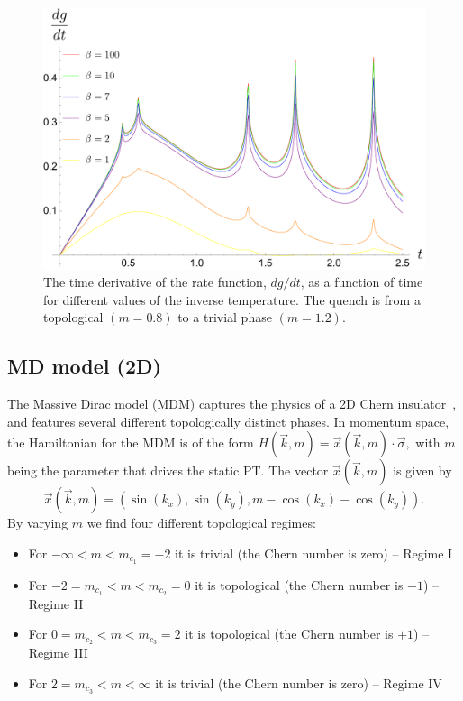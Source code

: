 \begin{figure}[h]
\begin{center}
\includegraphics[scale=0.3]{SSH_topological_to_trivial.pdf}
    \caption{The time derivative of the rate function, $dg/dt$, as a function of time for different values of the inverse temperature. The quench is from a topological $(m=0.8)$ to a trivial phase $  (m=1.2)$.}
\end{center}
\label{fig:SSHtopologicaltrivial}
\end{figure}


\subsection{MD model (2D)}


The Massive Dirac model (MDM) captures the physics of a 2D Chern insulator~\cite{qi:hug:zha:08}, and features several different topologically distinct phases. In momentum space, the Hamiltonian for the MDM is of the form $H(\vec{k},m)=\vec{x}(\vec{k},m)\cdot\vec{\sigma},$ with $m$ being the parameter that drives the static PT. The vector $\vec{x}(\vec{k},m)$ is given by
\begin{equation*}
\vec{x}(\vec{k},m)=(\sin(k_x),\sin(k_y),m-\cos(k_x)-\cos(k_y)).
\end{equation*}
By varying $m$ we find four different topological regimes:

\begin{itemize}
\item For $-\infty<m<m_{c_1}=-2$ it is trivial (the Chern number is zero) -- Regime I
\item For $-2=m_{c_1}<m<m_{c_2}=0$ it is topological (the Chern number is $-1$) -- Regime II
\item For $0=m_{c_2}<m<m_{c_3}=2$ it is topological (the Chern number is $+1$) -- Regime III
\item For $2=m_{c_3}<m<\infty$ it is trivial (the Chern number is zero) -- Regime IV
\end{itemize}


